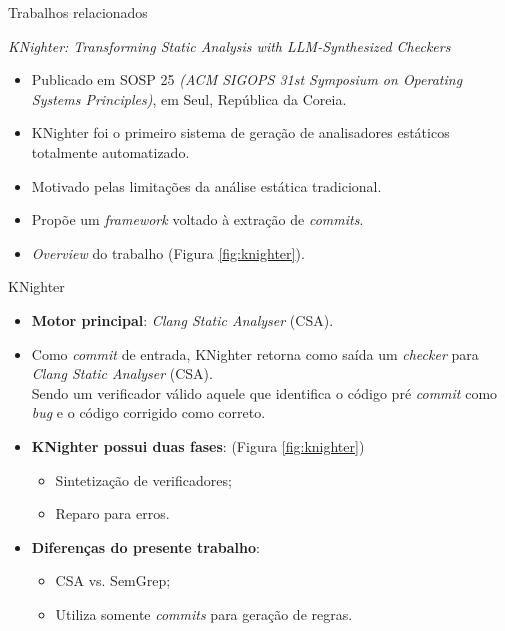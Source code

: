 \documentclass[
    aspectratio=169,   %
    12pt,
    brazil
]{beamer}
\newcommand{\minhaspaginas}{}
\begin{document}
\renewcommand{\minhaspaginas}{\small 36 - 38}
\begin{frame}{Trabalhos relacionados}
  \begin{block}{\textit{KNighter: Transforming Static Analysis with LLM-Synthesized Checkers} \cite{yang2025knighter}}
    \begin{itemize}
      \item  Publicado em SOSP 25 \textit{(ACM SIGOPS 31st Symposium on Operating Systems Principles)}, em Seul, República da Coreia.
      \item KNighter foi o primeiro sistema de geração de analisadores estáticos totalmente automatizado.
      \item Motivado pelas limitações da análise estática tradicional.
      \item Propõe um \textit{framework} voltado à extração de \textit{commits}.
      \item \textit{Overview} do trabalho (Figura \ref{fig:knighter}).
    \end{itemize}
  \end{block}
\end{frame}

\renewcommand{\minhaspaginas}{\small 36 - 38}
\begin{frame}{KNighter}
  \begin{itemize}
    \item \textbf{Motor principal}: \textit{Clang Static Analyser} (CSA).
    \item Como \textit{commit} de entrada, KNighter retorna como saída um \textit{checker} para \textit{Clang Static Analyser} (CSA).
     \\
    {\small Sendo um verificador válido aquele que identifica o código pré \textit{commit} como \textit{bug} e o código corrigido como correto.}
    \item \textbf{KNighter possui duas fases}: (Figura \ref{fig:knighter})
      \begin{itemize}
        \item Sintetização de verificadores;
        \item Reparo para erros.
      \end{itemize}
    \item \textbf{Diferenças do presente trabalho}:
      \begin{itemize}
        \item CSA vs. SemGrep;
        \item Utiliza somente \textit{commits} para geração de regras.
      \end{itemize}
  \end{itemize}
\end{frame}
\end{document}
